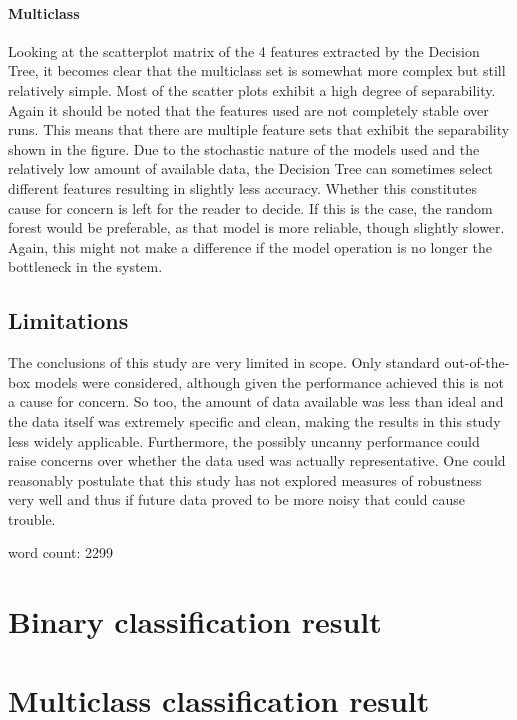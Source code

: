 \documentclass[british]{article}
\begin{document}
	\paragraph{Multiclass} Looking at the scatterplot matrix of the 4 features extracted by the Decision Tree, it becomes clear that the multiclass set is somewhat more complex but still relatively simple. Most of the scatter plots exhibit a high degree of separability. Again it should be noted that the features used are not completely stable over runs. This means that there are multiple feature sets that exhibit the separability shown in the figure. Due to the stochastic nature of the models used and the relatively low amount of available data, the Decision Tree can sometimes select different features resulting in slightly less accuracy. Whether this constitutes cause for concern is left for the reader to decide. If this is the case, the random forest would be preferable, as that model is more reliable, though slightly slower. Again, this might not make a difference if the model operation is no longer the bottleneck in the system.     
	
	\subsection{Limitations}
	The conclusions of this study are very limited in scope. Only standard out-of-the-box models were considered, although given the performance achieved this is not a cause for concern. So too, the amount of data available was less than ideal and the data itself was extremely specific and clean, making the results in this study less widely applicable. Furthermore, the possibly uncanny performance could raise concerns over whether the data used was actually representative. One could reasonably postulate that this study has not explored measures of robustness very well and thus if future data proved to be more noisy that could cause trouble.
	
	
	word count:  2299
	\FloatBarrier
	\printbibliography

	\begin{appendices}
	\section{Binary classification result}
	\label{binary}
	
	
	\section{Multiclass classification result}
	\label{multiclass}
	
\end{appendices}
\end{document}
